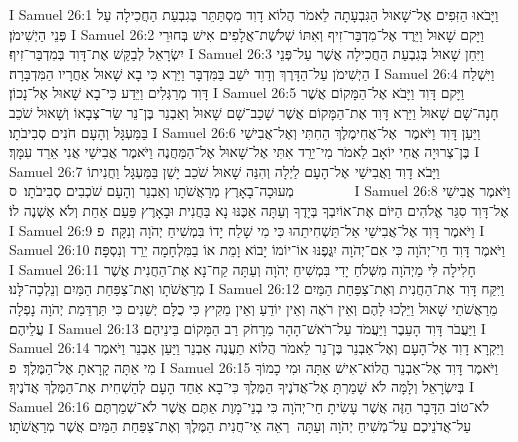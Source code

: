 I Samuel 26:1	וַיָּבֹאוּ הַזִּפִים אֶל־שָׁאוּל הַגִּבְעָתָה לֵאמֹר הֲלוֹא דָוִד מִסְתַּתֵּר בְּגִבְעַת הַחֲכִילָה עַל פְּנֵי הַיְשִׁימֹן׃
I Samuel 26:2	וַיָּקם שָׁאוּל וַיֵּרֶד אֶל־מִדְבַּר־זִיף וְאִתּוֹ שְׁלֹשֶׁת־אֲלָפִים אִישׁ בְּחוּרֵי יִשְׂרָאֵל לְבַקֵּשׁ אֶת־דָּוִד בְּמִדְבַּר־זִיף׃
I Samuel 26:3	וַיִּחַן שָׁאוּל בְּגִבְעַת הַחֲכִילָה אֲשֶׁר עַל־פְּנֵי הַיְשִׁימֹן עַל־הַדָּרֶךְ וְדָוִד יֹשֵׁב בַּמִּדְבָּר וַיַּרְא כִּי בָא שָׁאוּל אַחֲרָיו הַמִּדְבָּרָה׃
I Samuel 26:4	וַיִּשְׁלַח דָּוִד מְרַגְּלִים וַיֵּדַע כִּי־בָא שָׁאוּל אֶל־נָכוֹן׃
I Samuel 26:5	וַיָּקם דָּוִד וַיָּבֹא אֶל־הַמָּקוֹם אֲשֶׁר חָנָה־שָׁם שָׁאוּל וַיַּרְא דָּוִד אֶת־הַמָּקוֹם אֲשֶׁר שָׁכַב־שָׁם שָׁאוּל וְאַבְנֵר בֶּן־נֵר שַׂר־צְבָאוֹ וְשָׁאוּל שֹׁכֵב בַּמַּעְגָּל וְהָעָם חֹנִים סְבִיבֹתָו׃
I Samuel 26:6	וַיַּעַן דָּוִד וַיֹּאמֶר  אֶל־אֲחִימֶלֶךְ הַחִתִּי וְאֶל־אֲבִישַׁי בֶּן־צְרוּיָה אֲחִי יוֹאָב לֵאמֹר מִי־יֵרֵד אִתִּי אֶל־שָׁאוּל אֶל־הַמַּחֲנֶה וַיֹּאמֶר אֲבִישַׁי אֲנִי אֵרֵד עִמָּךְ׃
I Samuel 26:7	וַיָּבֹא דָוִד וַאֲבִישַׁי  אֶל־הָעָם לַיְלָה וְהִנֵּה שָׁאוּל שֹׁכֵב יָשֵׁן בַּמַּעְגָּל וַחֲנִיתוֹ מְעוּכָה־בָאָרֶץ מְרַאֲשֹׁתָו וְאַבְנֵר וְהָעָם שֹׁכְבִים סְבִיבֹתָו׃ {ס}        
I Samuel 26:8	וַיֹּאמֶר אֲבִישַׁי אֶל־דָּוִד סִגַּר אֱלֹהִים הַיּוֹם אֶת־אוֹיִבְךָ בְּיָדֶךָ וְעַתָּה אַכֶּנּוּ נָא בַּחֲנִית וּבָאָרֶץ פַּעַם אַחַת וְלֹא אֶשְׁנֶה לוֹ׃
I Samuel 26:9	וַיֹּאמֶר דָּוִד אֶל־אֲבִישַׁי אַל־תַּשְׁחִיתֵהוּ כִּי מִי שָׁלַח יָדוֹ בִּמְשִׁיחַ יְהֹוָה וְנִקָּה׃ {פ}
I Samuel 26:10	וַיֹּאמֶר דָּוִד חַי־יְהֹוָה כִּי אִם־יְהֹוָה יִגֳּפֶנּוּ אוֹ־יוֹמוֹ יָבוֹא וָמֵת אוֹ בַמִּלְחָמָה יֵרֵד וְנִסְפָּה׃
I Samuel 26:11	חָלִילָה לִּי מֵיְהֹוָה מִשְּׁלֹחַ יָדִי בִּמְשִׁיחַ יְהֹוָה וְעַתָּה קַח־נָא אֶת־הַחֲנִית אֲשֶׁר מְרַאֲשֹׁתָו וְאֶת־צַפַּחַת הַמַּיִם וְנֵלְכָה־לָּנוּ׃
I Samuel 26:12	וַיִּקַּח דָּוִד אֶת־הַחֲנִית וְאֶת־צַפַּחַת הַמַּיִם מֵרַאֲשֹׁתֵי שָׁאוּל וַיֵּלְכוּ לָהֶם וְאֵין רֹאֶה וְאֵין יוֹדֵעַ וְאֵין מֵקִיץ כִּי כֻלָּם יְשֵׁנִים כִּי תַּרְדֵּמַת יְהֹוָה נָפְלָה עֲלֵיהֶם׃
I Samuel 26:13	וַיַּעֲבֹר דָּוִד הָעֵבֶר וַיַּעֲמֹד עַל־רֹאשׁ־הָהָר מֵרָחֹק רַב הַמָּקוֹם בֵּינֵיהֶם׃
I Samuel 26:14	וַיִּקְרָא דָוִד אֶל־הָעָם וְאֶל־אַבְנֵר בֶּן־נֵר לֵאמֹר הֲלוֹא תַעֲנֶה אַבְנֵר וַיַּעַן אַבְנֵר וַיֹּאמֶר מִי אַתָּה קָרָאתָ אֶל־הַמֶּלֶךְ׃ {פ}
I Samuel 26:15	וַיֹּאמֶר דָּוִד אֶל־אַבְנֵר הֲלוֹא־אִישׁ אַתָּה וּמִי כָמוֹךָ בְּיִשְׂרָאֵל וְלָמָּה לֹא שָׁמַרְתָּ אֶל־אֲדֹנֶיךָ הַמֶּלֶךְ כִּי־בָא אַחַד הָעָם לְהַשְׁחִית אֶת־הַמֶּלֶךְ אֲדֹנֶיךָ׃
I Samuel 26:16	לֹא־טוֹב הַדָּבָר הַזֶּה אֲשֶׁר עָשִׂיתָ חַי־יְהֹוָה כִּי בְנֵי־מָוֶת אַתֶּם אֲשֶׁר לֹא־שְׁמַרְתֶּם עַל־אֲדֹנֵיכֶם עַל־מְשִׁיחַ יְהֹוָה וְעַתָּה  רְאֵה אֵי־חֲנִית הַמֶּלֶךְ וְאֶת־צַפַּחַת הַמַּיִם אֲשֶׁר מְרַאֲשֹׁתָו׃
